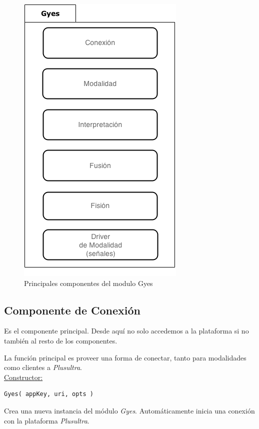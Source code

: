 \begin{center}
  \begin{figure}[h]
    \centering
    \includegraphics[scale=0.7]{gfx/gyes}
    \caption{Principales componentes del modulo Gyes}
    \label{fig:arq_ours_gyes}
  \end{figure}
\end{center}

\subsection{Componente de Conexión}

Es el componente principal. Desde aquí no solo accedemos a la plataforma si no también al resto de los componentes. 

La función principal es proveer una forma de conectar, tanto para modalidades como clientes a \emph{Plusultra}.
\\

\underline{\textsf{Constructor:}}\\
\begin{lstlisting}
Gyes( appKey, uri, opts )
\end{lstlisting}
Crea una nueva instancia del módulo \emph{Gyes}. Automáticamente inicia una conexión con la plataforma \emph{Plusultra}.
\\ 

